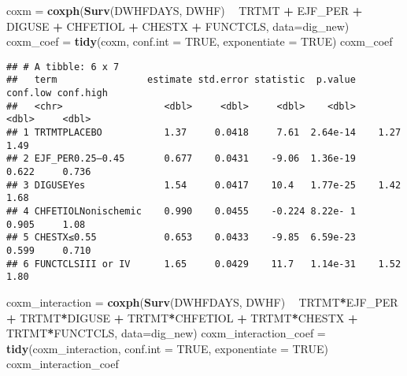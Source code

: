 \documentclass[
]{article}
\newenvironment{Shaded}{\begin{snugshade}}{\end{snugshade}}
\newcommand{\DataTypeTok}[1]{\textcolor[rgb]{0.13,0.29,0.53}{#1}}
\newcommand{\KeywordTok}[1]{\textcolor[rgb]{0.13,0.29,0.53}{\textbf{#1}}}
\newcommand{\NormalTok}[1]{#1}
\newcommand{\OperatorTok}[1]{\textcolor[rgb]{0.81,0.36,0.00}{\textbf{#1}}}
\newcommand{\OtherTok}[1]{\textcolor[rgb]{0.56,0.35,0.01}{#1}}
\newcommand{\StringTok}[1]{\textcolor[rgb]{0.31,0.60,0.02}{#1}}
\begin{document}
\begin{Shaded}
\begin{Highlighting}[]
\NormalTok{coxm =}\StringTok{ }\KeywordTok{coxph}\NormalTok{(}\KeywordTok{Surv}\NormalTok{(DWHFDAYS, DWHF) }\OperatorTok{~}\StringTok{ }\NormalTok{TRTMT }\OperatorTok{+}\StringTok{ }\NormalTok{EJF_PER }\OperatorTok{+}\StringTok{ }\NormalTok{DIGUSE }\OperatorTok{+}\StringTok{ }\NormalTok{CHFETIOL }\OperatorTok{+}\StringTok{ }\NormalTok{CHESTX }\OperatorTok{+}\StringTok{ }\NormalTok{FUNCTCLS, }\DataTypeTok{data=}\NormalTok{dig_new)}
\NormalTok{coxm_coef =}\StringTok{ }\KeywordTok{tidy}\NormalTok{(coxm, }\DataTypeTok{conf.int =} \OtherTok{TRUE}\NormalTok{, }\DataTypeTok{exponentiate =} \OtherTok{TRUE}\NormalTok{)}
\NormalTok{coxm_coef}
\end{Highlighting}
\end{Shaded}

\begin{verbatim}
## # A tibble: 6 x 7
##   term                estimate std.error statistic  p.value conf.low conf.high
##   <chr>                  <dbl>     <dbl>     <dbl>    <dbl>    <dbl>     <dbl>
## 1 TRTMTPLACEBO           1.37     0.0418     7.61  2.64e-14    1.27      1.49 
## 2 EJF_PER0.25–0.45       0.677    0.0431    -9.06  1.36e-19    0.622     0.736
## 3 DIGUSEYes              1.54     0.0417    10.4   1.77e-25    1.42      1.68 
## 4 CHFETIOLNonischemic    0.990    0.0455    -0.224 8.22e- 1    0.905     1.08 
## 5 CHESTX≤0.55            0.653    0.0433    -9.85  6.59e-23    0.599     0.710
## 6 FUNCTCLSIII or IV      1.65     0.0429    11.7   1.14e-31    1.52      1.80
\end{verbatim}

\begin{Shaded}
\begin{Highlighting}[]
\NormalTok{coxm_interaction =}\StringTok{ }\KeywordTok{coxph}\NormalTok{(}\KeywordTok{Surv}\NormalTok{(DWHFDAYS, DWHF) }\OperatorTok{~}\StringTok{ }\NormalTok{TRTMT}\OperatorTok{*}\NormalTok{EJF_PER }\OperatorTok{+}\StringTok{ }\NormalTok{TRTMT}\OperatorTok{*}\NormalTok{DIGUSE }\OperatorTok{+}\StringTok{ }\NormalTok{TRTMT}\OperatorTok{*}\NormalTok{CHFETIOL }\OperatorTok{+}\StringTok{ }\NormalTok{TRTMT}\OperatorTok{*}\NormalTok{CHESTX }\OperatorTok{+}\StringTok{ }\NormalTok{TRTMT}\OperatorTok{*}\NormalTok{FUNCTCLS, }\DataTypeTok{data=}\NormalTok{dig_new)}
\NormalTok{coxm_interaction_coef =}\StringTok{ }\KeywordTok{tidy}\NormalTok{(coxm_interaction, }\DataTypeTok{conf.int =} \OtherTok{TRUE}\NormalTok{, }\DataTypeTok{exponentiate =} \OtherTok{TRUE}\NormalTok{)}
\NormalTok{coxm_interaction_coef}
\end{Highlighting}
\end{Shaded}
\end{document}
